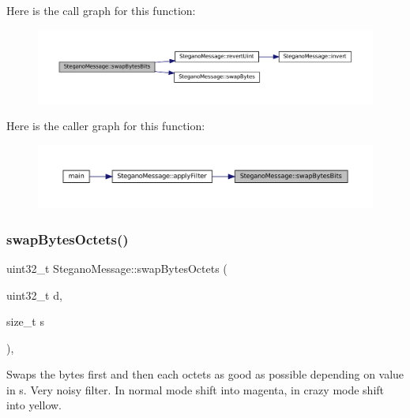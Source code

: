 Here is the call graph for this function\+:\nopagebreak
\begin{figure}[H]
\begin{center}
\leavevmode
\includegraphics[width=350pt]{classSteganoMessage_a67f4f4c91ecddb89368c4b9cc42ac07e_cgraph}
\end{center}
\end{figure}
Here is the caller graph for this function\+:\nopagebreak
\begin{figure}[H]
\begin{center}
\leavevmode
\includegraphics[width=350pt]{classSteganoMessage_a67f4f4c91ecddb89368c4b9cc42ac07e_icgraph}
\end{center}
\end{figure}
\mbox{\label{classSteganoMessage_ad21d0b7dd149e81d9a199fb26a799da4}} 
\subsubsection{\texorpdfstring{swapBytesOctets()}{swapBytesOctets()}}
{\footnotesize\ttfamily uint32\+\_\+t Stegano\+Message\+::swap\+Bytes\+Octets (\begin{DoxyParamCaption}\item[{uint32\+\_\+t}]{d,  }\item[{size\+\_\+t}]{s }\end{DoxyParamCaption})\hspace{0.3cm}{\ttfamily [static]}, {\ttfamily [private]}}



Swaps the bytes first and then each octets as good as possible depending on value in s. Very noisy filter. In normal mode shift into magenta, in crazy mode shift into yellow. 


